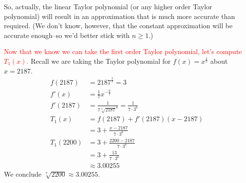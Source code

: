 \begin{solution}
So, actually, the linear Taylor polynomial (or any higher order Taylor polynomial) will result in an approximation that is much more accurate than required. (We don't know, however, that the constant approximation will be accurate enough--so we'd better stick with $n \geq 1$.)

\textcolor{red}{Now that we know we can take the first order Taylor polynomial, let's compute $T_1(x)$.} Recall we are taking the Taylor polynomial for $f(x)=x^{\tfrac{1}{7}}$ about $x=2187$.
\begin{align*}
f(2187)&=2187^{\tfrac{1}{7}}=3\\
f'(x)&=\frac{1}{7}x^{-\tfrac{6}{7}}\\
f'(2187)&=\frac{1}{7\sqrt[7]{2187}^6}=\frac{1}{7\cdot3^6}\\
T_1(x)&=f(2187)+f'(2187)(x-2187)\\
&=3+\frac{x-2187}{7\cdot3^6}\\
T_1(2200)&=3+\frac{2200-2187}{7\cdot3^6}\\
&=3+\frac{13}{7\cdot 3^6}\\
&\approx 3.00255
\end{align*}
We conclude $\sqrt[7]{2200}\approx 3.00255$.
\end{solution}


